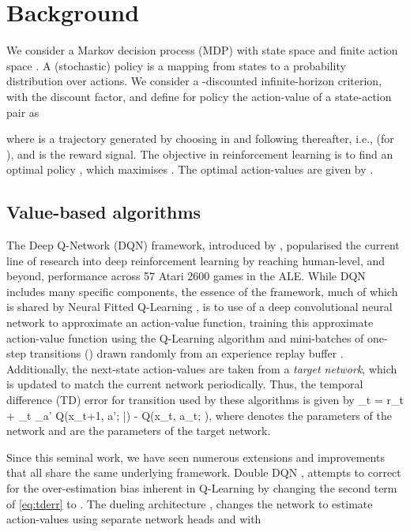 \documentclass{article}
\newcommand{\beqa}{}
\begin{document}
\section{Background}
We consider a Markov decision process (MDP) with state space  and finite 
action space . 
A (stochastic) policy  is a mapping from states  to a 
probability distribution over 
actions. We consider a -discounted infinite-horizon criterion, with 
 the discount factor, and define for policy  the action-value of 
a state-action pair  as 

where  is a trajectory generated by choosing  in  
and following  thereafter, i.e.,  (for ), 
and  is the reward signal. The objective in reinforcement learning 
is to find an optimal policy , which maximises . 
The optimal action-values are given by . 



\subsection{Value-based algorithms}

The Deep Q-Network (DQN) framework, introduced by \citet{mnih15human}, 
popularised the current line of research into deep reinforcement learning by reaching 
human-level, and beyond, performance across 57 Atari 2600 games in the ALE. 
While DQN includes many specific components, the essence of the framework, much 
of which is shared by Neural Fitted Q-Learning \citep{riedmiller2005neural}, is 
to use of a deep convolutional neural network to approximate an action-value 
function, training this approximate action-value function using the 
Q-Learning algorithm \citep{watkins1992} and mini-batches of one-step 
transitions () drawn randomly from an 
experience replay buffer \citep{lin1992self}. Additionally, the next-state 
action-values are taken from a \textit{target network}, which is updated to 
match the current network periodically. Thus, the temporal difference (TD) error 
for transition  used by these algorithms is given by
\beqa\label{eq:tderr}
\delta_t = r_t + \gamma_t \max_{a' \in {}} Q(x_{t+1}, a'; \bar \theta) - Q(x_t, 
a_t; \theta),
\eeqa
where  denotes the parameters of the network and  are the 
parameters of the target network.

Since this seminal work, we have seen numerous extensions and improvements that 
all share the same underlying framework. Double DQN \citep{van2016deep}, 
attempts to correct for the over-estimation bias inherent in Q-Learning by 
changing the second term of \eqref{eq:tderr} to . The dueling architecture 
\citep{wang2015dueling}, changes the network to estimate 
action-values using separate network heads  and  with
\end{document}

